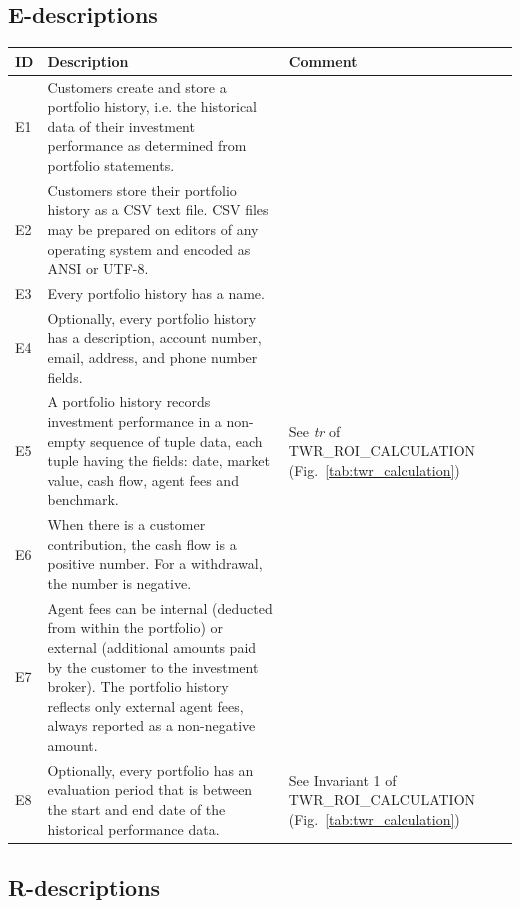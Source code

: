 \documentclass[runningheads,12pt]{article}
\begin{document}
\subsection{E-descriptions}

{\centering
\begin{tabular}{|l|p{9cm}|p{5cm}|}
\hline
\textbf{ID} & \textbf{Description} & \textbf{Comment}\\

\hline
E1 & Customers create and store a portfolio history, i.e. the historical data of their investment performance as determined from portfolio statements. & \\

\hline
E2 & Customers store their portfolio history as a CSV text file. CSV files may be prepared on editors of any operating system and encoded as ANSI or UTF-8. & \\

\hline
E3 & Every portfolio history has a name. & \\

\hline
E4 & Optionally, every portfolio history has a description, account number, email, address, and phone number fields. & \\

\hline
E5 & A portfolio history records investment performance in a non-empty sequence of tuple data, each tuple having the fields: date, market value, cash flow, agent fees and benchmark. & See \textit{tr} of TWR\_ROI\_CALCULATION (Fig.~\ref{tab:twr_calculation})\\

\hline
E6 & When there is a customer contribution, the cash flow is a positive number. For a withdrawal, the number is negative. & \\

\hline
E7 & Agent fees can be internal (deducted from within the portfolio) or external (additional amounts paid by the customer to the investment broker). The portfolio history reflects only external agent fees, always reported as a non-negative amount. & \\

\hline
E8 & Optionally, every portfolio has an evaluation period that is between the start and end date of the historical performance data. & See Invariant 1 of TWR\_ROI\_CALCULATION (Fig.~\ref{tab:twr_calculation})\\
\hline
\end{tabular}
}

\newpage
\subsection{R-descriptions}
\end{document}

